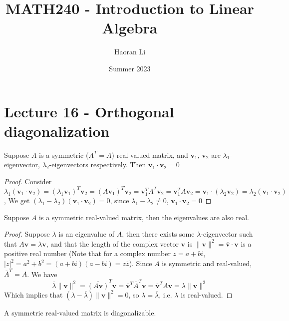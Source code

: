 \documentclass{beamer}
\title{MATH240 - Introduction to Linear Algebra}
\author{Haoran Li}
\institute[UMD]{University of Maryland, College Park}
\date{Summer 2023}
\theoremstyle{definition}
\theoremstyle{remark}
\begin{document}
\maketitle

\section{Lecture 16 - Orthogonal diagonalization}

\begin{frame}[t]
\begin{theorem}\label{23:54-07/19/2022}
Suppose $A$ is a symmetric ($A^T=A$) real-valued matrix, and $\mathbf v_1$, $\mathbf v_2$ are $\lambda_1$-eigenvector, $\lambda_2$-eigenvectors respectively. Then $\mathbf v_1\cdot\mathbf v_2=0$
\end{theorem}
\pause
\begin{proof}
Consider $\lambda_1(\mathbf v_1\cdot\mathbf v_2)=(\lambda_1\mathbf v_1)^T\mathbf v_2=(A\mathbf v_1)^T\mathbf v_2=\mathbf v_1^TA^T\mathbf v_2=\mathbf v_1^TA\mathbf v_2=\mathbf v_1\cdot(\lambda_2\mathbf v_2)=\lambda_2(\mathbf v_1\cdot\mathbf v_2)$, We get $(\lambda_1-\lambda_2)(\mathbf v_1\cdot\mathbf v_2)=0$, since $\lambda_1-\lambda_2\neq0$, $\mathbf v_1\cdot\mathbf v_2=0$
\end{proof}
\pause
\begin{theorem}
Suppose $A$ is a symmetric real-valued matrix, then the eigenvalues are also real.
\end{theorem}
\end{frame}

\begin{frame}[t]
\begin{proof}
Suppose $\lambda$ is an eigenvalue of $A$, then there exists some $\lambda$-eigenvector such that $A\mathbf v=\lambda\mathbf v$, and that the length of the complex vector $\mathbf v$ is $\|\mathbf v\|^2=\overline{\mathbf v}\cdot\mathbf v$ is a positive real number (Note that for a complex number $z=a+bi$, $|z|^2=a^2+b^2=(a+bi)(a-bi)=z\overline z$). Since $A$ is symmetric and real-valued, $\overline A^T=A$. We have
\[
\overline\lambda\|\mathbf v\|^2=\overline{(A\mathbf v)}^T\mathbf v=\overline{\mathbf v}^T\overline A^T\mathbf v=\overline{\mathbf v}^TA\mathbf v=\lambda\|\mathbf v\|^2
\]
Which implies that $(\lambda-\overline\lambda)\|\mathbf v\|^2=0$, so $\lambda=\overline\lambda$, i.e. $\lambda$ is real-valued.
\end{proof}
\pause
\begin{fact}
A symmetric real-valued matrix is diagonalizable.
\end{fact}
\end{frame}
\end{document}
